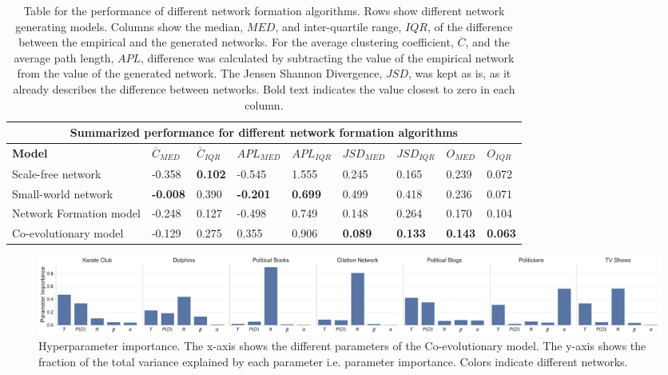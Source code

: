 \documentclass[11pt]{article}
\begin{document}
\begin{table}[H]
\begin{center}
    
\begin{tabular}{ |p{4.2cm}||p{1cm}|p{0.9cm}|p{1.35cm}|p{1.3cm}|p{1.35cm}|p{1.2cm}|p{0.93cm}|p{0.9cm}|}
    \hline
    \multicolumn{9}{|c|}{Summarized performance for different network formation algorithms} \\
    \hline
    \bf{Model} & $\overline{C}_{MED}$ & $\overline{C}_{IQR}$ & $APL_{MED}$ & $APL_{IQR}$ & $JSD_{MED}$ & $JSD_{IQR}$ & $O_{MED}$ & $O_{IQR}$\\
    \hline
    Scale-free network   & -0.358    & \bf{0.102} &   -0.545	 &   1.555 &   0.245	 & 0.165 & 0.239 & 0.072\\
    Small-world network &   \bf{-0.008}  & 0.390   & \bf{-0.201}	&   \bf{0.699} &   0.499 & 0.418 & 0.236 & 0.071\\
    Network Formation model   &-0.248		 & 0.127	&  -0.498	 & 0.749 &   0.148 & 0.264 & 0.170 & 0.104\\
    Co-evolutionary model & -0.129 & 0.275 & 0.355	 & 0.906 & \bf{0.089} & \bf{0.133} & \bf{0.143} & \bf{0.063} \\
    \hline
\end{tabular}
\end{center}
\caption{Table for the performance of different network formation algorithms. Rows show different network generating models. Columns show the median, $MED$, and inter-quartile range, $IQR$, of the difference between the empirical and the generated networks. For the average clustering coefficient, $\overline{C}$, and the average path length, $APL$, difference was calculated by subtracting the value of the empirical network from the value of the generated network. The Jensen Shannon Divergence, $JSD$, was kept as is, as it already describes the difference between networks. Bold text indicates the value closest to zero in each column.}
\label{table:performance}
\end{table}

\begin{figure}[H]
    \centering
    \includegraphics[width=.9\linewidth]{../plots/overall/Parameter_Importance.pdf}
  \caption{Hyperparameter importance. The x-axis shows the different parameters of the Co-evolutionary model. The y-axis shows the fraction of the total variance explained by each parameter i.e. parameter importance. Colors indicate different networks.}
  \label{fig:eval_importance}
\end{figure}
\end{document}
